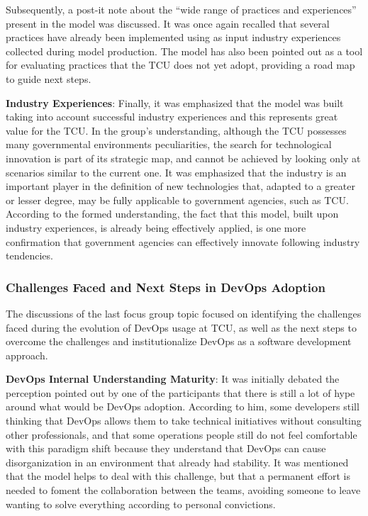 Subsequently, a post-it note about the ``wide range of practices and experiences''
present in the model was discussed. It was once again recalled that several
practices have already been implemented using as input industry experiences
collected during model production. The model has also been pointed out as a tool
for evaluating practices that the TCU does not yet adopt, providing a road map
to guide next steps.

\textbf{Industry Experiences}: Finally, it was emphasized that the model was
built taking into account successful industry experiences and this represents
great value for the TCU. In the group's understanding, although the TCU
possesses many governmental environments peculiarities, the search for
technological innovation is part of its strategic map, and cannot be achieved
by looking only at scenarios similar to the current one. It was emphasized that
the industry is an important player in the definition of new technologies that,
adapted to a greater or lesser degree, may be fully applicable to government
agencies, such as TCU. According to the formed understanding, the fact that this
model, built upon industry experiences, is already being effectively applied, is
one more confirmation that government agencies can effectively innovate following
industry tendencies.

\subsubsection{Challenges Faced and Next Steps in DevOps Adoption}

The discussions of the last focus group topic focused on identifying the
challenges faced during the evolution of DevOps usage at TCU, as well as the
next steps to overcome the challenges and institutionalize DevOps as a
software development approach.

\textbf{DevOps Internal Understanding Maturity}:
It was initially debated the perception pointed out by one of the participants
that there is still a lot of hype around what would be DevOps adoption. According
to him, some developers still thinking that DevOps allows them to take technical
initiatives without consulting other professionals, and that some operations
people still do not feel comfortable with this paradigm shift because they
understand that DevOps can cause disorganization in an environment that already
had stability. It was mentioned that the model helps to deal with this challenge,
but that a permanent effort is needed to foment the collaboration between the teams,
avoiding someone to leave wanting to solve everything according to personal
convictions.

